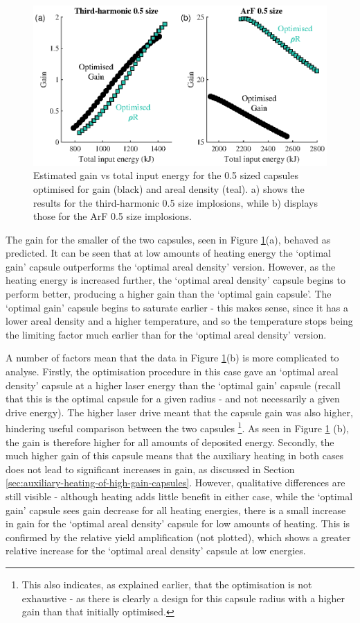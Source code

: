 \begin{figure}[ht]
\centering
\includegraphics{figures/FurtherSims/OptimisedRhoR.eps}
\caption{Estimated gain vs total input energy for the 0.5 sized capsules optimised for gain (black) and areal density (teal). a) shows the results for the third-harmonic 0.5 size implosions, while b) displays those for the ArF 0.5 size implosions.}
\label{fig:OptimisedRhoR}
\end{figure}

The gain for the smaller of the two capsules, seen in Figure \ref{fig:OptimisedRhoR}(a), behaved as predicted. It can be seen that at low amounts of heating energy the `optimal gain' capsule outperforms the `optimal areal density' version. However, as the heating energy is increased further, the `optimal areal density' capsule begins to perform better, producing a higher gain than the `optimal gain capsule'. The `optimal gain' capsule begins to saturate earlier - this makes sense, since it has a lower areal density and a higher temperature, and so the temperature stops being the limiting factor much earlier than for the `optimal areal density' version.

A number of factors mean that the data in Figure \ref{fig:OptimisedRhoR}(b) is more complicated to analyse. Firstly, the optimisation procedure in this case gave an `optimal areal density' capsule at a higher laser energy than the `optimal gain' capsule (recall that this is the optimal capsule for a given radius - and not necessarily a given drive energy). The higher laser drive meant that the capsule gain was also higher, hindering useful comparison between the two capsules \footnote{This also indicates, as explained earlier, that the optimisation is not exhaustive - as there is clearly a design for this capsule radius with a higher gain than that initially optimised.}. As seen in Figure \ref{fig:OptimisedRhoR} (b), the gain is therefore higher for all amounts of deposited energy. Secondly, the much higher gain of this capsule means that the auxiliary heating in both cases does not lead to significant increases in gain, as discussed in Section \ref{sec:auxiliary-heating-of-high-gain-capsules}. However, qualitative differences are still visible - although heating adds little benefit in either case, while the `optimal gain' capsule sees gain decrease for all heating energies, there is a small increase in gain for the `optimal areal density' capsule for low amounts of heating. This is confirmed by the relative yield amplification (not plotted), which shows a greater relative increase for the `optimal areal density' capsule at low energies.

